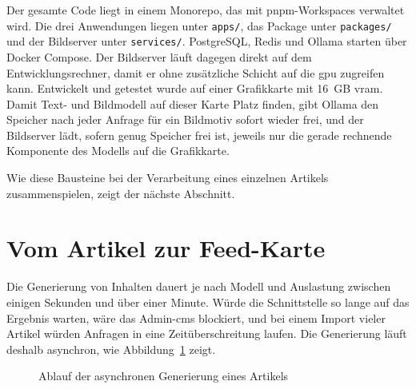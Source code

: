 Der gesamte Code liegt in einem Monorepo, das mit pnpm-Workspaces verwaltet wird.
Die drei Anwendungen liegen unter \texttt{apps/}, das Package unter \texttt{packages/} und der Bildserver unter \texttt{services/}.
PostgreSQL, Redis und Ollama starten über Docker Compose.
Der Bildserver läuft dagegen direkt auf dem Entwicklungsrechner, damit er ohne zusätzliche Schicht auf die \gls{gpu} zugreifen kann.
Entwickelt und getestet wurde auf einer Grafikkarte mit 16~GB \gls{vram}.
Damit Text- und Bildmodell auf dieser Karte Platz finden, gibt Ollama den Speicher nach jeder Anfrage für ein Bildmotiv sofort wieder frei, und der Bildserver lädt, sofern genug Speicher frei ist, jeweils nur die gerade rechnende Komponente des Modells auf die Grafikkarte.

Wie diese Bausteine bei der Verarbeitung eines einzelnen Artikels zusammenspielen, zeigt der nächste Abschnitt.

\section{Vom Artikel zur Feed-Karte}\label{sec:arch:flow}
\setauthor{\firstauthor}

Die Generierung von Inhalten dauert je nach Modell und Auslastung zwischen einigen Sekunden und über einer Minute.
Würde die Schnittstelle so lange auf das Ergebnis warten, wäre das Admin-\gls{cms} blockiert, und bei einem Import vieler Artikel würden Anfragen in eine Zeitüberschreitung laufen.
Die Generierung läuft deshalb asynchron, wie Abbildung~\ref{fig:arch:flow} zeigt.

\begin{figure}
    \centering
    \caption{Ablauf der asynchronen Generierung eines Artikels}
    \label{fig:arch:flow}
\end{figure}

